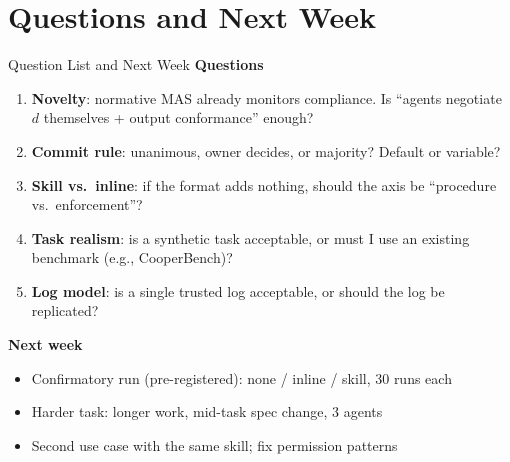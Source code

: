 \documentclass[aspectratio=169,11pt]{beamer}
\begin{document}
\section{Questions and Next Week}
\begin{frame}{Question List and Next Week}
  \footnotesize
  \textbf{Questions}
  \begin{enumerate}
    \item \textbf{Novelty}: normative MAS already monitors compliance. Is ``agents negotiate $d$ themselves + output conformance'' enough?
    \item \textbf{Commit rule}: unanimous, owner decides, or majority? Default or variable?
    \item \textbf{Skill vs.\ inline}: if the format adds nothing, should the axis be ``procedure vs.\ enforcement''?
    \item \textbf{Task realism}: is a synthetic task acceptable, or must I use an existing benchmark (e.g., CooperBench)?
    \item \textbf{Log model}: is a single trusted log acceptable, or should the log be replicated?
  \end{enumerate}
  \textbf{Next week}
  \begin{itemize}
    \item Confirmatory run (pre-registered): none / inline / skill, 30 runs each
    \item Harder task: longer work, mid-task spec change, 3 agents
    \item Second use case with the same skill; fix permission patterns
  \end{itemize}
\end{frame}

\end{document}

